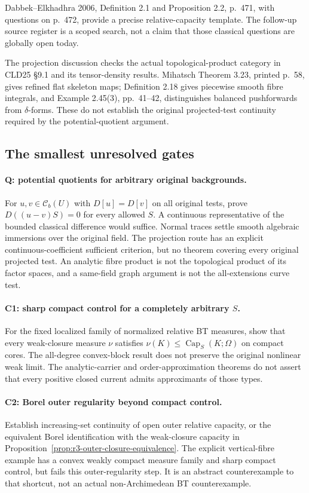 \documentclass[11pt,a4paper]{article}
\numberwithin{equation}{section}
\theoremstyle{definition}
\theoremstyle{remark}
\newcommand{\Cb}{\mathcal C_b}
\begin{document}
Dabbek--Elkhadhra 2006, Definition 2.1 and Proposition 2.2,
p.~471, with questions on p.~472, provide a precise relative-capacity
template. The follow-up source register is a scoped search, not a
claim that those classical questions are globally open today.
\cite[\S2]{DE06}

The projection discussion checks the actual topological-product
category in CLD25 \S9.1 and its tensor-density results. Mihatsch
Theorem 3.23, printed p.~58, gives refined flat skeleton maps;
Definition 2.18 gives piecewise smooth fibre integrals, and
Example 2.45(3), pp.~41--42, distinguishes balanced pushforwards
from $\delta$-forms. These do not establish the original projected-test
continuity required by the potential-quotient argument.
\cite[\S9.1--9.4]{CLD25}\cite[2.18, 2.45(3), 3.23]{Mih24}

\subsection{The smallest unresolved gates}

\paragraph{Q: potential quotients for arbitrary original backgrounds.}
For $u,v\in\Cb(U)$ with $D[u]=D[v]$ on all original tests,
prove $D((u-v)S)=0$ for every allowed $S$. A continuous representative
of the bounded classical difference would suffice. Normal traces
settle smooth algebraic immersions over the original field. The projection
route has an explicit continuous-coefficient sufficient criterion,
but no theorem covering every original projected test. An analytic
fibre product is not the topological product of its factor spaces,
and a same-field graph argument is not the all-extensions curve test.

\paragraph{C1: sharp compact control for a completely arbitrary $S$.}
For the fixed localized family of normalized relative BT measures,
show that every weak-closure measure $\nu$ satisfies
$\nu(K)\leq\operatorname{Cap}_S(K;\Omega)$ on compact cores.
The all-degree convex-block result does not preserve the original
nonlinear weak limit. The analytic-carrier and order-approximation
theorems do not assert that every positive closed current admits
approximants of those types.

\paragraph{C2: Borel outer regularity beyond compact control.}
Establish increasing-set continuity of open outer relative capacity,
or the equivalent Borel identification with the weak-closure capacity
in Proposition~\ref{prop:r3-outer-closure-equivalence}. The explicit
vertical-fibre example has a convex weakly compact measure family
and sharp compact control, but fails this outer-regularity step.
It is an abstract counterexample to that shortcut, not an actual
non-Archimedean BT counterexample.
\end{document}
